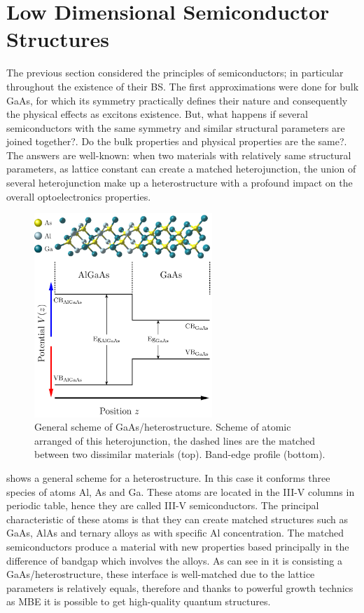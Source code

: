 \section{Low Dimensional Semiconductor Structures}
\label{sec:chapter-1-low-dimensional-structures}
\vspace{-10mm} 
The previous section considered the principles of semiconductors; in particular throughout the existence of their \gls{BS}. The first approximations were done for bulk GaAs, for which its symmetry practically defines their nature and consequently the physical effects as excitons existence.  But, what happens  if several semiconductors with the same symmetry and similar structural parameters are joined together?. Do the bulk properties and physical properties are the same?. 
The answers  are well-known: when two materials with relatively same structural parameters, as lattice constant can create a matched heterojunction, the union of several heterojunction make up a heterostructure with a profound impact on the overall optoelectronics properties.\\
\begin{figure}[ht!]
	\centering
	\includegraphics[width=0.6\textwidth]{../figures/chapter-1/heterostructures/build-ruco/hs-01}
	\caption{General scheme of GaAs/\algaas heterostructure. Scheme of atomic arranged of this heterojunction, the dashed lines are the matched between two dissimilar
	materials (top). Band-edge profile (bottom).}
	\label{fig:subsection-1.2-heterostructure}
\end{figure}
 shows  a general scheme for a heterostructure. In this case it conforms three species of atoms Al, As and Ga. These atoms are located in the III-V columns in periodic table, hence they are called III-V semiconductors. The principal characteristic of these atoms is that they can create matched structures such as GaAs, AlAs and ternary alloys as \algaas with specific Al concentration. The matched semiconductors produce a material with new properties based principally in the difference of bandgap which involves the alloys. 
As can see in  it is consisting a GaAs/\algaas heterostructure, these interface is well-matched due to the lattice parameters is relatively equals, therefore and thanks to powerful growth technics as MBE it is possible to get high-quality quantum structures. 

